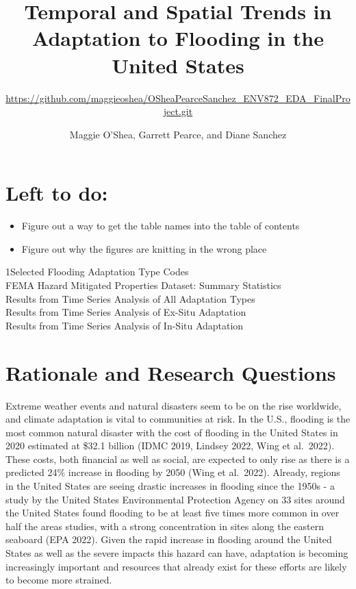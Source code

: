 \documentclass[
  12pt,
]{article}
\title{Temporal and Spatial Trends in Adaptation to Flooding in the
United States}
\subtitle{\url{https://github.com/maggieoshea/OSheaPearceSanchez_ENV872_EDA_FinalProject.git}}
\author{Maggie O'Shea, Garrett Pearce, and Diane Sanchez}
\date{}
\providecommand{\tightlist}{%
  \setlength{\itemsep}{0pt}\setlength{\parskip}{0pt}}
\begin{document}
\maketitle

\hypertarget{left-to-do}{%
\section{Left to do:}\label{left-to-do}}

\begin{itemize}
\tightlist
\item
  Figure out a way to get the table names into the table of contents
\item
  Figure out why the figures are knitting in the wrong place
\end{itemize}

\newpage
\tableofcontents 
\newpage
\listoftables

1Selected Flooding Adaptation Type Codes\\
 FEMA Hazard Mitigated Properties Dataset: Summary Statistics\\
 Results from Time Series Analysis of All Adaptation Types\\
 Results from Time Series Analysis of Ex-Situ Adaptation\\
 Results from Time Series Analysis of In-Situ Adaptation\\
\newpage

\listoffigures 
\newpage

\newpage

\hypertarget{rationale-and-research-questions}{%
\section{Rationale and Research
Questions}\label{rationale-and-research-questions}}

Extreme weather events and natural disasters seem to be on the rise
worldwide, and climate adaptation is vital to communities at risk. In
the U.S., flooding is the most common natural disaster with the cost of
flooding in the United States in 2020 estimated at \$32.1 billion (IDMC
2019, Lindsey 2022, Wing et al.~2022). These costs, both financial as
well as social, are expected to only rise as there is a predicted 24\%
increase in flooding by 2050 (Wing et al.~2022). Already, regions in the
United States are seeing drastic increases in flooding since the 1950s -
a study by the United States Environmental Protection Agency on 33 sites
around the United States found flooding to be at least five times more
common in over half the areas studies, with a strong concentration in
sites along the eastern seaboard (EPA 2022). Given the rapid increase in
flooding around the United States as well as the severe impacts this
hazard can have, adaptation is becoming increasingly important and
resources that already exist for these efforts are likely to become more
strained.
\end{document}
